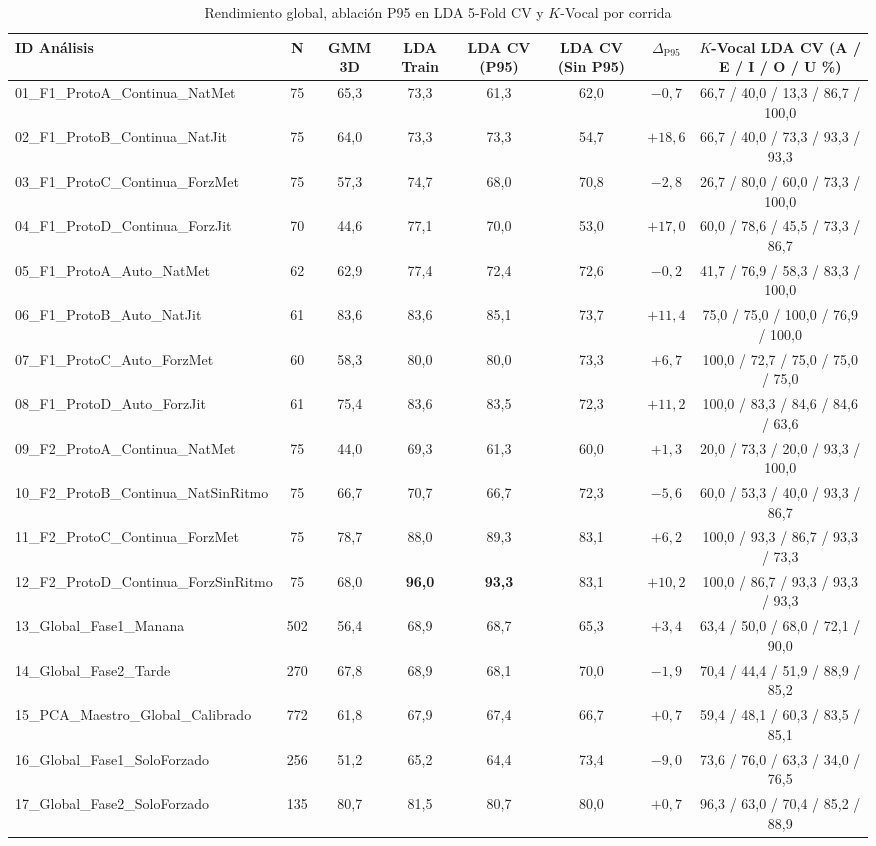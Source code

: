 \documentclass[11pt,a4paper]{article}
\begin{document}
\begin{table}[h!]
\centering
\caption{Rendimiento global, ablaci\'on P95 en LDA 5-Fold CV y $K$-Vocal por corrida}
\label{tab:resultados}
\scriptsize
\begin{tabular}{lccccccc}
\toprule
\textbf{ID An\'alisis} & \textbf{N} & \textbf{GMM 3D} & \textbf{LDA Train} & \textbf{LDA CV (P95)} & \textbf{LDA CV (Sin P95)} & \textbf{$\Delta_{\text{P95}}$} & \textbf{$K$-Vocal LDA CV (A / E / I / O / U \%)} \\
\midrule
01\_F1\_ProtoA\_Continua\_NatMet & 75 & 65,3 & 73,3 & 61,3 & 62,0 & $-0{,}7$ & 66,7 / 40,0 / 13,3 / 86,7 / 100,0 \\
02\_F1\_ProtoB\_Continua\_NatJit & 75 & 64,0 & 73,3 & 73,3 & 54,7 & $+18{,}6$ & 66,7 / 40,0 / 73,3 / 93,3 / 93,3 \\
03\_F1\_ProtoC\_Continua\_ForzMet & 75 & 57,3 & 74,7 & 68,0 & 70,8 & $-2{,}8$ & 26,7 / 80,0 / 60,0 / 73,3 / 100,0 \\
04\_F1\_ProtoD\_Continua\_ForzJit & 70 & 44,6 & 77,1 & 70,0 & 53,0 & $+17{,}0$ & 60,0 / 78,6 / 45,5 / 73,3 / 86,7 \\
05\_F1\_ProtoA\_Auto\_NatMet & 62 & 62,9 & 77,4 & 72,4 & 72,6 & $-0{,}2$ & 41,7 / 76,9 / 58,3 / 83,3 / 100,0 \\
06\_F1\_ProtoB\_Auto\_NatJit & 61 & 83,6 & 83,6 & 85,1 & 73,7 & $+11{,}4$ & 75,0 / 75,0 / 100,0 / 76,9 / 100,0 \\
07\_F1\_ProtoC\_Auto\_ForzMet & 60 & 58,3 & 80,0 & 80,0 & 73,3 & $+6{,}7$ & 100,0 / 72,7 / 75,0 / 75,0 / 75,0 \\
08\_F1\_ProtoD\_Auto\_ForzJit & 61 & 75,4 & 83,6 & 83,5 & 72,3 & $+11{,}2$ & 100,0 / 83,3 / 84,6 / 84,6 / 63,6 \\
09\_F2\_ProtoA\_Continua\_NatMet & 75 & 44,0 & 69,3 & 61,3 & 60,0 & $+1{,}3$ & 20,0 / 73,3 / 20,0 / 93,3 / 100,0 \\
10\_F2\_ProtoB\_Continua\_NatSinRitmo & 75 & 66,7 & 70,7 & 66,7 & 72,3 & $-5{,}6$ & 60,0 / 53,3 / 40,0 / 93,3 / 86,7 \\
11\_F2\_ProtoC\_Continua\_ForzMet & 75 & 78,7 & 88,0 & 89,3 & 83,1 & $+6{,}2$ & 100,0 / 93,3 / 86,7 / 93,3 / 73,3 \\
12\_F2\_ProtoD\_Continua\_ForzSinRitmo & 75 & 68,0 & \textbf{96,0} & \textbf{93,3} & 83,1 & $+10{,}2$ & 100,0 / 86,7 / 93,3 / 93,3 / 93,3 \\
13\_Global\_Fase1\_Manana & 502 & 56,4 & 68,9 & 68,7 & 65,3 & $+3{,}4$ & 63,4 / 50,0 / 68,0 / 72,1 / 90,0 \\
14\_Global\_Fase2\_Tarde & 270 & 67,8 & 68,9 & 68,1 & 70,0 & $-1{,}9$ & 70,4 / 44,4 / 51,9 / 88,9 / 85,2 \\
15\_PCA\_Maestro\_Global\_Calibrado & 772 & 61,8 & 67,9 & 67,4 & 66,7 & $+0{,}7$ & 59,4 / 48,1 / 60,3 / 83,5 / 85,1 \\
16\_Global\_Fase1\_SoloForzado & 256 & 51,2 & 65,2 & 64,4 & 73,4 & $-9{,}0$ & 73,6 / 76,0 / 63,3 / 34,0 / 76,5 \\
17\_Global\_Fase2\_SoloForzado & 135 & 80,7 & 81,5 & 80,7 & 80,0 & $+0{,}7$ & 96,3 / 63,0 / 70,4 / 85,2 / 88,9 \\
\bottomrule
\end{tabular}
\end{table}
\end{document}
